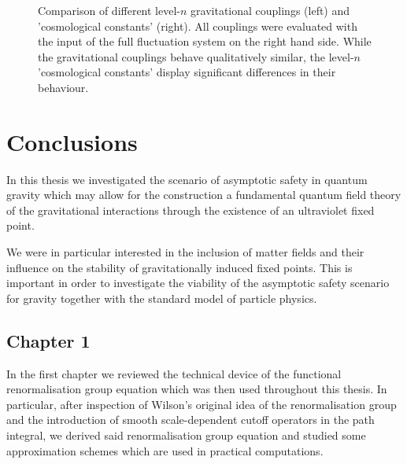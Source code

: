 \documentclass[11pt]{book}
\numberwithin{equation}{chapter}
\begin{document}
\begin{figure}[p]
  \begin{center}
    
  \end{center}
  \caption{
    Comparison of different level-$n$ gravitational couplings (left) and 'cosmological constants' (right).
    All couplings were evaluated with the input of the full fluctuation system on the right hand side.
    While the gravitational couplings behave qualitatively similar,
    the level-$n$ 'cosmological constants' display significant differences in their behaviour.
  }
  \label{fig:noeffuniv}
\end{figure}




\chapter*{Conclusions}

In this thesis we investigated the scenario of asymptotic safety in quantum gravity
which may allow for the construction a fundamental quantum field theory of the
gravitational interactions through the existence of an ultraviolet fixed point.

We were in particular interested in the inclusion of matter fields and their influence
on the stability of gravitationally induced fixed points.
This is important in order to investigate the viability of the asymptotic safety scenario
for gravity together with the standard model of particle physics.

\section*{Chapter 1}

In the first chapter we reviewed the technical device of the functional renormalisation
group equation which was then used throughout this thesis.
In particular, after inspection
of Wilson's original idea of the renormalisation group and the introduction
of smooth scale-dependent cutoff operators in the path integral, we derived
said renormalisation group equation and studied some approximation schemes
which are used in practical computations.
\end{document}
